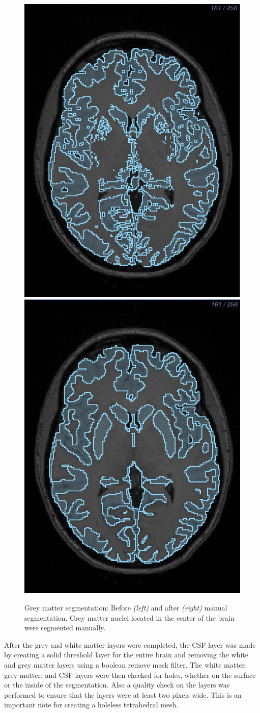 \begin{figure}[H]
\begin{center}
\includegraphics[width=.49\textwidth]{Figures/greymatter_before_nuclei}
\includegraphics[width=.49\textwidth]{Figures/greymatter_added_nuclei}
\caption{Grey matter segmentation: Before \textit{(left)} and after \textit{(right)} manual segmentation. Grey matter nuclei located in the center of the brain were segmented manually.}
\label{fig:gm}
\end{center}
\end{figure}

After the grey and white matter layers were completed, the CSF layer was made by creating a solid threshold layer for the entire brain and removing the white and grey matter layers using a boolean remove mask filter. The white matter, grey matter, and CSF layers were then checked for holes, whether on the surface or the inside of the segmentation. Also a quality check on the layers was performed to ensure that the layers were at least two pixels wide. This is an important note for creating a holeless tetrahedral mesh. 

